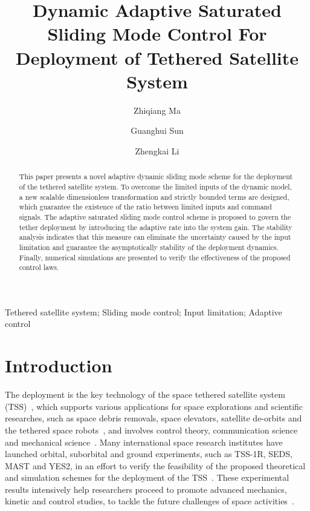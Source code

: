 \documentclass[3p]{elsarticle}
\theoremstyle{plain}
\theoremstyle{remark}
\begin{document}
\begin{frontmatter}
\title{Dynamic Adaptive Saturated Sliding Mode Control For Deployment of Tethered Satellite System}
\author{Zhiqiang Ma}
\author{Guanghui Sun}
{\author{Zhengkai Li}}
\address{Research Institute of Intelligent Control and Systems, Harbin Institute of Technology, Harbin 150001, China}



\begin{abstract}
This paper presents a novel adaptive dynamic sliding mode scheme for the deployment of the tethered satellite system. To overcome the limited inputs of the dynamic model, a new scalable dimensionless transformation and strictly bounded terms are designed, which guarantee the existence of the ratio between limited inputs and command signals. The adaptive saturated sliding mode control scheme is proposed to govern the tether deployment by introducing the adaptive rate into the system gain. The stability analysis indicates that this measure can eliminate the uncertainty caused by the input limitation and guarantee the asymptotically stability of the deployment dynamics. Finally, numerical simulations are presented to verify the effectiveness of the proposed control laws.
\end{abstract}
\begin{keyword}
Tethered satellite system;  Sliding mode control;  Input limitation; Adaptive control
\end{keyword}
\end{frontmatter}
\section{Introduction}
The deployment is the key technology of the space tethered satellite system (TSS)~\cite{wen2008advances,yousefian2015anti}, which supports various applications for space explorations and scientific researches, such as space debris removals, space elevators, satellite de-orbits and the tethered space robots~\cite{zhao2014thrust,kojima2015mission,zhong2013dynamics,zhong2013long,Huang2016Impact,Huang2016,Huang2016416}, and involves control theory, communication science and mechanical science~\cite{Li2014,Huang2016171,Huang20161985}. Many international space research institutes have launched orbital, suborbital and ground experiments, such as TSS-1R, SEDS, MAST and YES2, in an effort to verify the feasibility of the proposed theoretical and simulation schemes for the deployment of the TSS~\cite{williams2012review,robitaille2006interpreting,stone1998tss,williams2009yes2}. These experimental results intensively help researchers proceed to promote advanced mechanics, kinetic and control studies, to tackle the future challenges of space activities~\cite{yu2016nonlinear,wen2015space,aslanov2016swing,meng2016lyapunov,zhang2015line,Xu2016Hybrid}.
\end{document}
